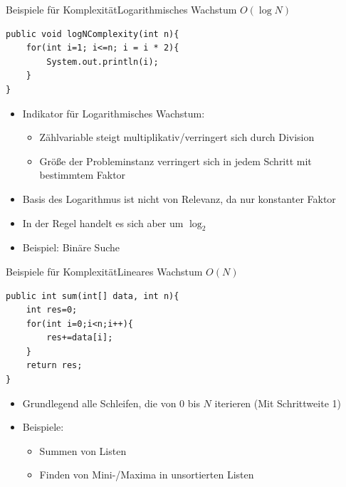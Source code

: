 \begin{frame}[fragile]{Beispiele für Komplexität}{Logarithmisches Wachstum $O(\log N)$}
\lstset{style=java}
\begin{lstlisting}
public void logNComplexity(int n){
    for(int i=1; i<=n; i = i * 2){
        System.out.println(i);
    }
}
\end{lstlisting}
\begin{itemize}
    \item Indikator für Logarithmisches Wachstum:
    \begin{itemize}
        \item Zählvariable steigt multiplikativ/verringert sich durch Division
        \item Größe der Probleminstanz verringert sich in jedem Schritt mit bestimmtem Faktor
    \end{itemize}
    \item Basis des Logarithmus ist nicht von Relevanz, da nur konstanter Faktor
    \item In der Regel handelt es sich aber um $\log_2$
    \item Beispiel: Binäre Suche
\end{itemize}
\end{frame}

\begin{frame}[fragile]{Beispiele für Komplexität}{Lineares Wachstum $O(N)$}
\lstset{style=java}
\begin{lstlisting}
public int sum(int[] data, int n){
    int res=0;
    for(int i=0;i<n;i++){
        res+=data[i];
    }
    return res;
}
\end{lstlisting}
\begin{itemize}
    \item Grundlegend alle Schleifen, die von 0 bis $N$ iterieren (Mit Schrittweite 1)
    \item Beispiele:
    \begin{itemize}
        \item Summen von Listen
        \item Finden von Mini-/Maxima in unsortierten Listen
    \end{itemize}
\end{itemize}
\end{frame}

